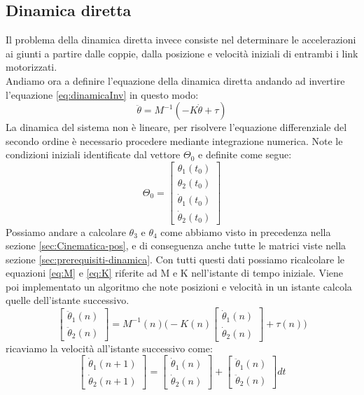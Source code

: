 \subsection{Dinamica diretta}
Il problema della dinamica diretta invece consiste nel determinare le accelerazioni ai giunti a partire dalle coppie, dalla posizione e velocità iniziali di entrambi i link motorizzati.
\\Andiamo ora a definire l'equazione della dinamica diretta andando ad invertire l'equazione \ref{eq:dinamicaInv} in questo modo:
\begin{equation}
	\ddot{\theta} = M^{-1}(-K\dot{\theta}+\tau)
	\label{eq:dinamicaDiretta}
\end{equation}
La dinamica del sistema non è lineare, per risolvere l'equazione differenziale del secondo ordine è necessario procedere mediante integrazione numerica. Note le condizioni iniziali identificate dal vettore $\Theta_0$ e definite come segue:
\begin{equation*}
    \Theta_0 = \begin{bmatrix}
    \theta_1(t_0) \\ \theta_2(t_0) \\ \dot{\theta}_1(t_0) \\ \dot{\theta}_2(t_0)
    \end{bmatrix}
\end{equation*}
Possiamo andare a calcolare $\theta_3$ e $\theta_4$ come abbiamo visto in precedenza nella sezione \ref{sec:Cinematica-pos}, e di conseguenza anche tutte le matrici viste nella sezione \ref{sec:prerequisiti-dinamica}. Con tutti questi dati possiamo  ricalcolare le equazioni \ref{eq:M} e \ref{eq:K} riferite ad M e K nell'istante di tempo iniziale. Viene poi implementato un algoritmo che note posizioni e velocità in un istante calcola quelle dell'istante successivo.
\begin{equation*}
	\begin{bmatrix}
		\ddot{\theta}_1(n) \\ \ddot{\theta}_2(n)
	\end{bmatrix} = 
 M^{-1}(n)\Bigg( -K(n)\begin{bmatrix}
 	\dot{\theta}_1(n) \\ \dot{\theta}_2(n)
 \end{bmatrix}+\tau(n)\Bigg)
\end{equation*} 
ricaviamo la velocità all'istante successivo come:
\begin{equation*}
	\begin{bmatrix}
		\dot{\theta}_1 (n+1) \\ \dot{\theta}_2(n+1)
	\end{bmatrix} = \begin{bmatrix}
	\dot{\theta}_1 (n) \\ \dot{\theta}_2(n)
\end{bmatrix} + \begin{bmatrix}
\ddot{\theta}_1 (n) \\ \ddot{\theta}_2(n)
\end{bmatrix}dt
\end{equation*} 
